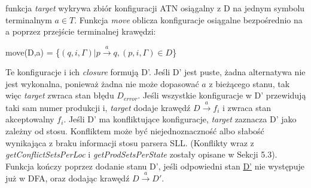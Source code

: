 funkcja \textit{target} wykrywa zbiór konfiguracji ATN osiągalny z D
na jednym symbolu terminalnym $a \in T$. Funkcja \textit{move} oblicza konfiguracje
osiągalne bezpośrednio na a poprzez przejście terminalnej krawędzi:
\par
move(D,a) = \{$(q,i,\Gamma) | p \overset{a}{\rightarrow} q, (p,i,\Gamma)\in D $\}
\par
Te konfiguracje i ich \textit{closure} formują D'.
Jeśli D' jest puste, żadna alternatywa nie jest wykonalna, ponieważ żadna nie może dopasować
$a$ z bieżącego stanu, tak więc \textit{target} zwraca stan błędu $D_{error}$.
Jeśli wszystkie konfiguracje w D' przewidują taki sam numer produkcji i,
\textit{target} dodaje krawędź $D \overset{a}{\rightarrow} f_i$ i zwraca stan akceptowalny $f_i$.
Jeśli D' ma konfliktujące konfiguracje, \textit{target} zaznacza D' jako zależny od stosu.
Konfliktem może być niejednoznaczność albo słabość wynikająca z braku informacji stosu parsera SLL.
(Konflikty wraz z \textit{getConflictSetsPerLoc} i \textit{getProdSetsPerState} zostały opisane w Sekcji 5.3).
Funkcja kończy poprzez dodanie stanu D', jeśli odpowiedni stan \underline{D'} nie występuje już w DFA,
oraz dodając krawędź $D\overset{a}{\rightarrow}D'$.
\\
 \\
